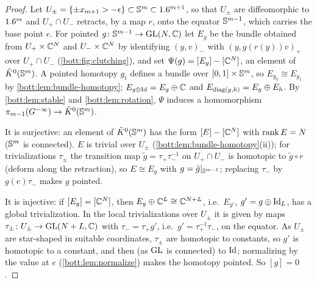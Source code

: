 \begin{proof}
  Let $U_\pm=\{\pm x_{m+1}>-\epsilon\}\subset\mathbb{S}^m\subset1.6^{m+1}$, so that $U_\pm$ are
  diffeomorphic to $1.6^m$ and $U_+\cap U_-$ retracts, by a map $r$, onto the equator
  $\mathbb{S}^{m-1}$, which carries the base point $e$. For pointed $g\colon\mathbb{S}^{m-1}\to\operatorname{GL}(N,\mathbb{C})$
  let $E_g$ be the bundle obtained from $U_+\times\mathbb{C}^N$ and $U_-\times\mathbb{C}^N$ by identifying
  $(y,v)_-$ with $(y,g(r(y))v)_+$ over $U_+\cap U_-$ (\cref{bott:fig:clutching}), and set $\Psi(g)=[E_g]-[\mathbb{C}^N]$, an
  element of $\tilde K^0(\mathbb{S}^m)$. A pointed homotopy $g_t$ defines a bundle over
  $[0,1]\times\mathbb{S}^m$, so $E_{g_0}\cong E_{g_1}$ by \cref{bott:lem:bundle-homotopy};
  $E_{g\oplus\operatorname{Id}}=E_g\oplus\mathbb{C}$ and $E_{\operatorname{diag}(g,h)}=E_g\oplus E_h$. By \cref{bott:lem:stable}
  and \cref{bott:lem:rotation}, $\Psi$ induces a homomorphism
  $\pi_{m-1}(G^{-\infty})\to\tilde K^0(\mathbb{S}^m)$.

  It is surjective: an element of $\tilde K^0(\mathbb{S}^m)$ has the form $[E]-[\mathbb{C}^N]$ with
  $\operatorname{rank} E=N$ ($\mathbb{S}^m$ is connected). $E$ is trivial over $U_\pm$
  (\cref{bott:lem:bundle-homotopy}(ii)); for trivializations $\tau_\pm$ the transition map
  $\tilde g=\tau_+\tau_-^{-1}$ on $U_+\cap U_-$ is homotopic to $\tilde g\circ r$ (deform along
  the retraction), so $E\cong E_g$ with $g=\tilde g|_{\mathbb{S}^{m-1}}$; replacing $\tau_-$ by
  $g(e)\tau_-$ makes $g$ pointed.

  It is injective: if $[E_g]=[\mathbb{C}^N]$, then $E_g\oplus\mathbb{C}^L\cong\mathbb{C}^{N+L}$, i.e.\ $E_{g'}$,
  $g'=g\oplus\operatorname{Id}_L$, has a global trivialization. In the local trivializations over $U_\pm$ it is given by maps
  $\tau_\pm\colon U_\pm\to\operatorname{GL}(N+L,\mathbb{C})$ with $\tau_-=\tau_+g'$, i.e.\ $g'=\tau_+^{-1}\tau_-$, on the equator. As $U_\pm$ are
  star-shaped in suitable coordinates, $\tau_\pm$ are homotopic to constants, so $g'$ is
  homotopic to a constant, and then (as $\operatorname{GL}$ is connected) to $\operatorname{Id}$; normalizing by the value
  at $e$ (\cref{bott:lem:normalize}) makes the homotopy pointed. So $[g]=0$.
\end{proof}

